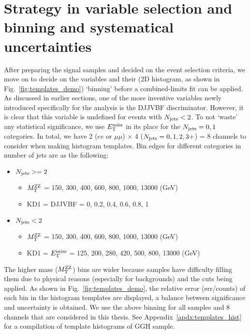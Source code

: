 \section{Strategy in variable selection and binning and systematical uncertainties}
After preparing the signal samples and decided on the event selection criteria, we move on to
decide on the variables and their (2D histogram, as shown in Fig.~\ref{fig:templates_demo}) `binning' before a combined-limits
fit can be applied. As discussed in earlier sections, one of the more inventive variables
newly introduced specifically for the analysis is the DJJVBF discriminator. However, it is
clear that this variable is undefined for events with $N_\mathrm{jets} < 2$. To
not `waste' any statistical significance, we use $E_{\mathrm{T}}^{\mathrm{miss}}$ in its place for the
$N_\mathrm{jets} = 0,1$ categories. In total, we have 2 ($ee$ or $\mu\mu$) $\times$ 4 ($N_\mathrm{jets} = 0,1,2,3+$) = 8
channels to consider when making histogram templates.
Bin edges for different categories in number of jets are as the following:
\begin{itemize} 
    \item $N_\mathrm{jets} >= 2$
        \begin{itemize} 
            \item $M_\mathrm{T}^{\mathrm{ZZ}}$ = 150, 300, 400, 600, 800, 1000, 13000 (GeV)
            \item KD1 = DJJVBF = 0, 0.2, 0.4, 0.6, 0.8, 1
        \end{itemize}
    \item $N_\mathrm{jets} < 2$
        \begin{itemize} 
            \item $M_\mathrm{T}^{\mathrm{ZZ}}$ = 150, 300, 400, 600, 800, 1000, 13000 (GeV)
            \item KD1 = $E_{\mathrm{T}}^{\mathrm{miss}}$ = 125, 200, 280, 420, 500, 800, 13000 (GeV)
        \end{itemize}
\end{itemize}
The higher mass ($M_\mathrm{T}^{\mathrm{ZZ}}$) bins are wider because samples
have difficulty filling them due to physical reasons (especially for backgrounds) 
and the cuts being applied. As shown in Fig.~\ref{fig:templates_demo}, the relative error (err/counts) of each
bin in the histogram templates are displayed, a balance between significance and uncertainty is
obtained. We use the above binning for all samples and 8 channels that are considered in this
thesis. See Appendix~\ref{apdx:templates_hist} for a compilation of template histograms of GGH sample.

